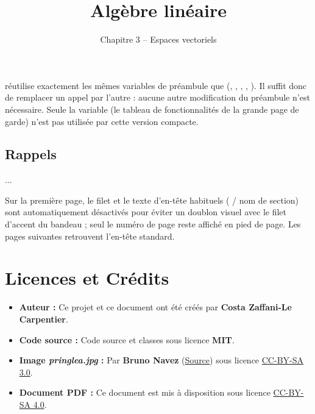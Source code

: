 \documentclass[theme=pringlea]{myrtille}
\begin{document}
\begin{infobox}
 réutilise exactement les mêmes variables de préambule que  (, , , , ). Il suffit donc de remplacer un appel par l'autre : aucune autre modification du préambule n'est nécessaire. Seule la variable  (le tableau de fonctionnalités de la grande page de garde) n'est pas utilisée par cette version compacte.
\end{infobox}

\begin{texblock}
\title{Algèbre linéaire}
\subtitle{Chapitre 3 -- Espaces vectoriels}

\begin{dοcument}
\makecoversimple   %
\section{Rappels}
...
\end{dοcument}
\end{texblock}

Sur la première page, le filet et le texte d'en-tête habituels ( / nom de section) sont automatiquement désactivés pour éviter un doublon visuel avec le filet d'accent du bandeau ; seul le numéro de page reste affiché en pied de page. Les pages suivantes retrouvent l'en-tête standard.

\section{Licences et Crédits}
\begin{itemize}
    \item \textbf{Auteur :} Ce projet et ce document ont été créés par \textbf{Costa Zaffani-Le Carpentier}.
    \item \textbf{Code source :} Code source  et classes  sous licence \textbf{MIT}.
    \item \textbf{Image \textit{pringlea.jpg} :} Par \textbf{Bruno Navez} (\href{https://commons.wikimedia.org/wiki/File:Pringlea_antiscorbutica.JPG}{Source}) sous licence \href{https://creativecommons.org/licenses/by-sa/3.0/deed.fr}{CC-BY-SA 3.0}.
    \item \textbf{Document PDF :} Ce document est mis à disposition sous licence \href{https://creativecommons.org/licenses/by-sa/4.0/deed.fr}{CC-BY-SA 4.0}.
\end{itemize}
\end{document}
